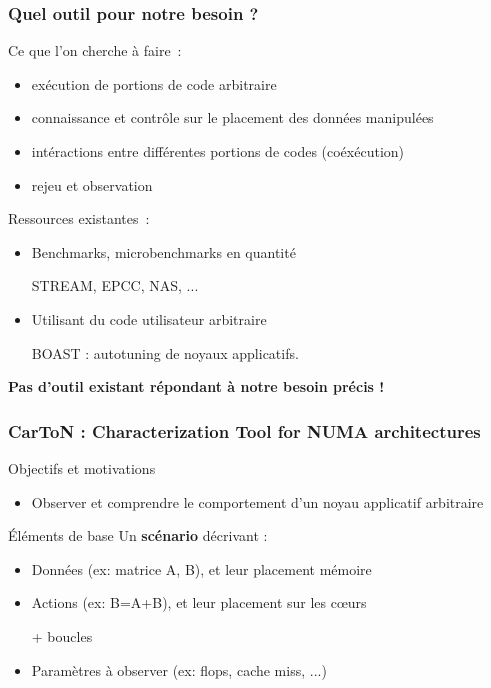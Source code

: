 \documentclass[xcolor={usenames,dvipsnames,svgnames,table}, aspectratio=43]{beamer}
\begin{document}
\begin{frame}
  \frametitle{Quel outil pour notre besoin ?}

  Ce que l'on cherche à faire~:
  \begin{itemize}
    \item exécution de portions de code arbitraire
    \item connaissance et contrôle sur le placement des données manipulées
    \item intéractions entre différentes portions de codes (coéxécution)
    \item rejeu et observation
  \end{itemize}

  Ressources existantes~:
  \begin{itemize}
    \item Benchmarks, microbenchmarks en quantité

      STREAM, EPCC, NAS, ...

    \item Utilisant du code utilisateur arbitraire

      BOAST : autotuning de noyaux applicatifs.
  \end{itemize}

  \textbf{Pas d'outil existant répondant à notre besoin précis !}

\end{frame}

\begin{frame}
  \frametitle{CarToN : Characterization Tool for NUMA architectures}

  \begin{block}{Objectifs et motivations}
    \begin{itemize}
      \item Observer et comprendre le comportement d'un noyau applicatif arbitraire
    \end{itemize}
  \end{block}

  \begin{block}{Éléments de base}
    Un \textbf{scénario} décrivant :
    \begin{itemize}
      \item Données (ex: matrice A, B), et leur placement mémoire
      \item Actions (ex: B=A+B), et leur placement sur les cœurs

	+ boucles
      \item Paramètres à observer (ex: flops, cache miss, ...)
    \end{itemize}
  \end{block}
\end{frame}
\end{document}
